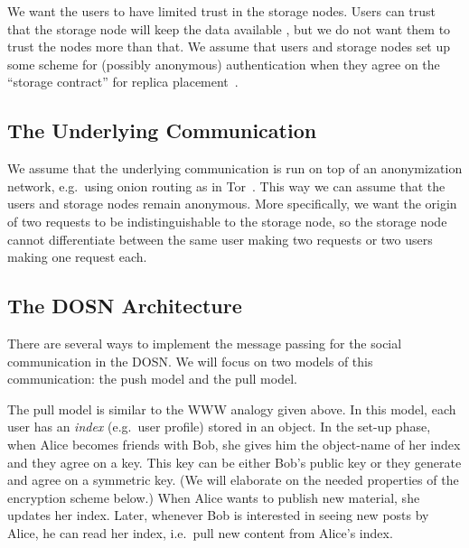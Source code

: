 We want the users to have limited trust in the storage nodes.
Users can trust that the storage node will keep the data available 
\cite{DataAvailability,ReplicaPlacement}, but we do not want them to trust the 
nodes more than that.
We assume that users and storage nodes set up some scheme for (possibly 
anonymous) authentication when they agree on the \enquote{storage contract} for 
replica placement~\cite{ReplicaPlacement}.

\subsection{The Underlying Communication}\label{sec:CommModel}


We assume that the underlying communication is run on top of an anonymization 
network, e.g.\ using onion routing as in Tor~\cite{Tor}.
This way we can assume that the users and storage nodes remain anonymous.
More specifically, we want the origin of two requests to be
indistinguishable to the storage node, so the storage node cannot differentiate 
between the same user making two requests or two users making one request each.

\subsection{The \acs{DOSN} Architecture}\label{sec:DOSN}

There are several ways to implement the message passing for the social 
communication in the \ac{DOSN}.
We will focus on two models of this communication: the push model and the pull 
model.

The pull model is similar to the \ac{WWW} analogy given above.
In this model, each user has an \emph{index} (e.g.\ user profile) stored in an 
object.
In the set-up phase, when Alice becomes friends with Bob, she gives him the 
object-name of her index and they agree on a key.
This key can be either Bob's public key or they generate and agree on 
a symmetric key.
(We will elaborate on the needed properties of the encryption scheme below.)
When Alice wants to publish new material, she updates her index.
Later, whenever Bob is interested in seeing new posts by Alice, he can read her 
index, i.e.\ pull new content from Alice's index.

